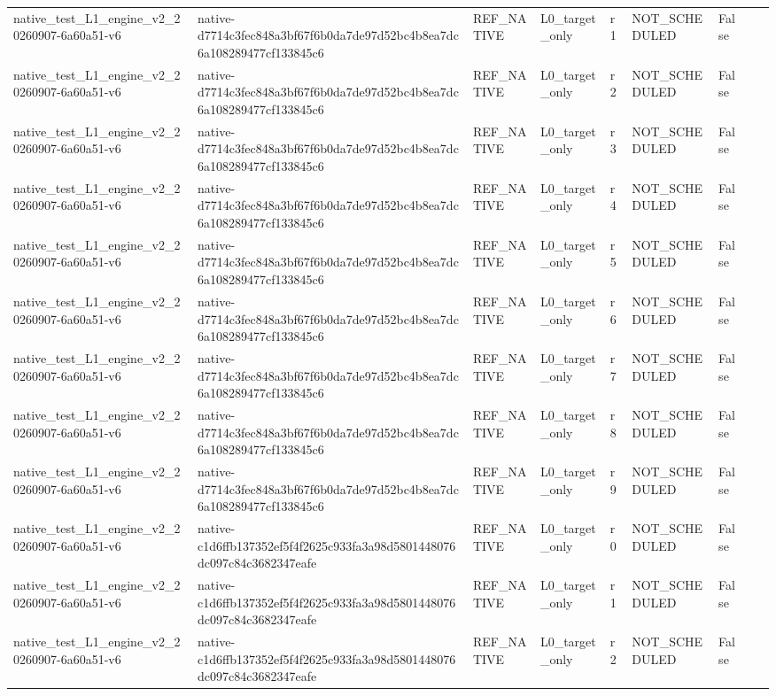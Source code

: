 \begin{tabular}{lllllllll}
native\_test\_L1\_engine\_v2\_20260907-6a60a51-v6 & native-d7714c3fec848a3bf67f6b0da7de97d52bc4b8ea7dc6a108289477cf133845c6 & REF\_NATIVE & L0\_target\_only & r1 & NOT\_SCHEDULED & False &  &  \\
native\_test\_L1\_engine\_v2\_20260907-6a60a51-v6 & native-d7714c3fec848a3bf67f6b0da7de97d52bc4b8ea7dc6a108289477cf133845c6 & REF\_NATIVE & L0\_target\_only & r2 & NOT\_SCHEDULED & False &  &  \\
native\_test\_L1\_engine\_v2\_20260907-6a60a51-v6 & native-d7714c3fec848a3bf67f6b0da7de97d52bc4b8ea7dc6a108289477cf133845c6 & REF\_NATIVE & L0\_target\_only & r3 & NOT\_SCHEDULED & False &  &  \\
native\_test\_L1\_engine\_v2\_20260907-6a60a51-v6 & native-d7714c3fec848a3bf67f6b0da7de97d52bc4b8ea7dc6a108289477cf133845c6 & REF\_NATIVE & L0\_target\_only & r4 & NOT\_SCHEDULED & False &  &  \\
native\_test\_L1\_engine\_v2\_20260907-6a60a51-v6 & native-d7714c3fec848a3bf67f6b0da7de97d52bc4b8ea7dc6a108289477cf133845c6 & REF\_NATIVE & L0\_target\_only & r5 & NOT\_SCHEDULED & False &  &  \\
native\_test\_L1\_engine\_v2\_20260907-6a60a51-v6 & native-d7714c3fec848a3bf67f6b0da7de97d52bc4b8ea7dc6a108289477cf133845c6 & REF\_NATIVE & L0\_target\_only & r6 & NOT\_SCHEDULED & False &  &  \\
native\_test\_L1\_engine\_v2\_20260907-6a60a51-v6 & native-d7714c3fec848a3bf67f6b0da7de97d52bc4b8ea7dc6a108289477cf133845c6 & REF\_NATIVE & L0\_target\_only & r7 & NOT\_SCHEDULED & False &  &  \\
native\_test\_L1\_engine\_v2\_20260907-6a60a51-v6 & native-d7714c3fec848a3bf67f6b0da7de97d52bc4b8ea7dc6a108289477cf133845c6 & REF\_NATIVE & L0\_target\_only & r8 & NOT\_SCHEDULED & False &  &  \\
native\_test\_L1\_engine\_v2\_20260907-6a60a51-v6 & native-d7714c3fec848a3bf67f6b0da7de97d52bc4b8ea7dc6a108289477cf133845c6 & REF\_NATIVE & L0\_target\_only & r9 & NOT\_SCHEDULED & False &  &  \\
native\_test\_L1\_engine\_v2\_20260907-6a60a51-v6 & native-c1d6ffb137352ef5f4f2625c933fa3a98d5801448076dc097c84c3682347eafe & REF\_NATIVE & L0\_target\_only & r0 & NOT\_SCHEDULED & False &  &  \\
native\_test\_L1\_engine\_v2\_20260907-6a60a51-v6 & native-c1d6ffb137352ef5f4f2625c933fa3a98d5801448076dc097c84c3682347eafe & REF\_NATIVE & L0\_target\_only & r1 & NOT\_SCHEDULED & False &  &  \\
native\_test\_L1\_engine\_v2\_20260907-6a60a51-v6 & native-c1d6ffb137352ef5f4f2625c933fa3a98d5801448076dc097c84c3682347eafe & REF\_NATIVE & L0\_target\_only & r2 & NOT\_SCHEDULED & False &  &  \\

\end{tabular}
